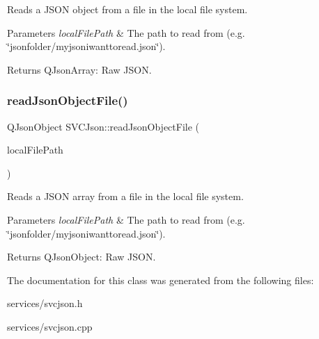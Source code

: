 Reads a J\+S\+ON object from a file in the local file system. 


\begin{DoxyParams}{Parameters}
{\em local\+File\+Path} & The path to read from (e.\+g. \char`\"{}jsonfolder/myjsoniwanttoread.\+json\char`\"{}). \\
\hline
\end{DoxyParams}
\begin{DoxyReturn}{Returns}
Q\+Json\+Array\+: Raw J\+S\+ON. 
\end{DoxyReturn}
\mbox{\label{class_s_v_c_json_aacff71253cc41cb2a403cf2226038962}} 
\subsubsection{\texorpdfstring{readJsonObjectFile()}{readJsonObjectFile()}}
{\footnotesize\ttfamily Q\+Json\+Object S\+V\+C\+Json\+::read\+Json\+Object\+File (\begin{DoxyParamCaption}\item[{Q\+String}]{local\+File\+Path }\end{DoxyParamCaption})}



Reads a J\+S\+ON array from a file in the local file system. 


\begin{DoxyParams}{Parameters}
{\em local\+File\+Path} & The path to read from (e.\+g. \char`\"{}jsonfolder/myjsoniwanttoread.\+json\char`\"{}). \\
\hline
\end{DoxyParams}
\begin{DoxyReturn}{Returns}
Q\+Json\+Object\+: Raw J\+S\+ON. 
\end{DoxyReturn}


The documentation for this class was generated from the following files\+:\begin{DoxyCompactItemize}
\item 
services/svcjson.\+h\item 
services/svcjson.\+cpp\end{DoxyCompactItemize}
